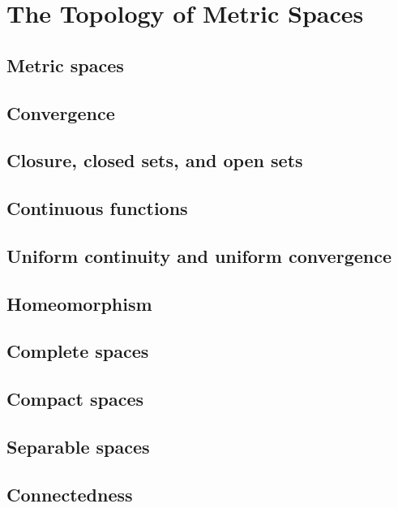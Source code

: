 \chapter{The Topology of Metric Spaces}
\section{Metric spaces}
\section{Convergence}
\section{Closure, closed sets, and open sets}
\section{Continuous functions}
\section{Uniform continuity and uniform convergence}
\section{Homeomorphism}
\section{Complete spaces}
\section{Compact spaces}
\section{Separable spaces}
\section{Connectedness}

